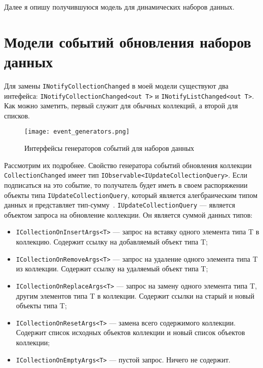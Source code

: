 Далее я опишу получившуюся модель для динамических наборов данных.

\section{Модели событий обновления наборов данных}
\label{sub:research:event_model}

Для замены \lstinline[style=csharpinlinestyle]!INotifyCollectionChanged! в моей модели существуют два интефейса:
\lstinline[style=csharpinlinestyle]!INotifyCollectionChanged<out T>! и \lstinline[style=csharpinlinestyle]!INotifyListChanged<out T>!.
Как можно заметить, первый служит для обычных коллекций, а второй для списков.

\begin{figure}[ht]
\centering
  \texttt{[image: event\_generators.png]}
  \caption{ Интерфейсы генераторов событий для наборов данных }
  \label{fig:event_generators}
\end{figure}

Рассмотрим их подробнее. Свойство генератора событий обновления коллекции \lstinline[style=csharpinlinestyle]!CollectionChanged! имеет тип \lstinline[style=csharpinlinestyle]!IObservable<IUpdateCollectionQuery>!.
Если подписаться на это событие, то получатель будет иметь в своем распоряжении объекты типа \lstinline[style=csharpinlinestyle]!IUpdateCollectionQuery!,
который является алегбраическим типом данных и представляет тип-сумму~\cite{algebraic_data_type}.
\lstinline[style=csharpinlinestyle]!IUpdateCollectionQuery! --- является объектом запроса на обновление коллекции.
Он является суммой данных типов:

\begin{itemize}
  \item \lstinline[style=csharpinlinestyle]!ICollectionOnInsertArgs<T>! --- запрос на вставку одного элемента типа T в коллекцию. Содержит ссылку на добавляемый объект типа T;
  \item \lstinline[style=csharpinlinestyle]!ICollectionOnRemoveArgs<T>! --- запрос на удаление одного элемента типа T из коллекции. Содержит ссылку на удаляемый объект типа T;
  \item \lstinline[style=csharpinlinestyle]!ICollectionOnReplaceArgs<T>! --- запрос на замену одного элемента типа T, другим элементов типа T в коллекции. Содержит ссылки на старый и новый объекты типа T;
  \item \lstinline[style=csharpinlinestyle]!ICollectionOnResetArgs<T>! --- замена всего содержимого коллекции. Содержит список исходных объектов коллекции и новый список объектов коллекции;
  \item \lstinline[style=csharpinlinestyle]!ICollectionOnEmptyArgs<T>! --- пустой запрос. Ничего не содержит.
\end{itemize}

